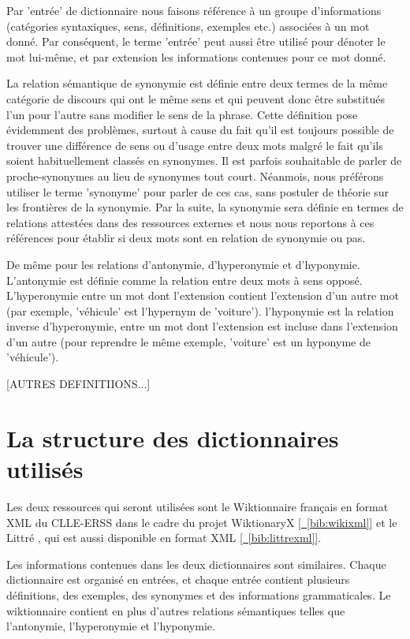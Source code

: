 \documentclass[a4paper, 12pt]{article}
\begin{document}
Par 'entrée' de dictionnaire nous faisons référence à un groupe d'informations (catégories syntaxiques, sens, définitions, exemples etc.) associées à un mot donné. Par conséquent, le terme 'entrée' peut aussi être utilisé pour dénoter le mot lui-même, et par extension les informations contenues pour ce mot donné.

La relation sémantique de synonymie est définie entre deux termes de la même catégorie de discours qui ont le même sens et qui peuvent donc être substitués l'un pour l'autre sans modifier le sens de la phrase. Cette définition pose évidemment des problèmes, surtout à cause du fait qu'il est toujours possible de trouver une différence de sens ou d'usage entre deux mots malgré le fait qu'ils soient habituellement classés en synonymes. Il est parfois souhaitable de parler de proche-synonymes au lieu de synonymes tout court. Néanmois, nous préférons utiliser le terme 'synonyme' pour parler de ces cas, sans postuler de théorie sur les frontières de la synonymie. Par la suite, la synonymie sera définie en termes de relations attestées dans des ressources externes et nous nous reportons à ces références pour établir si deux mots sont en relation de synonymie ou pas.

De même pour les relations d'antonymie, d'hyperonymie et d'hyponymie. L'antonymie est définie comme la relation entre deux mots à sens opposé. L'hyperonymie entre un mot dont l'extension contient l'extension d'un autre mot (par exemple, 'véhicule' est l'hypernym de 'voiture'). l'hyponymie est la relation inverse d'hyperonymie, entre un mot dont l'extension est incluse dans l'extension d'un autre (pour reprendre le même exemple, 'voiture' est un hyponyme de 'véhicule').

[AUTRES DEFINITIIONS...]

\section{La structure des dictionnaires utilisés}

Les deux ressources qui seront utilisées sont le Wiktionnaire français en format XML du CLLE-ERSS dans le cadre du projet WiktionaryX \hyperref[bib:wikixml]{[~\ref*{bib:wikixml}]} et le Littré , qui est aussi disponible en format XML \hyperref[bib:littrexml]{[~\ref*{bib:littrexml}]}.

Les informations contenues dans les deux dictionnaires sont similaires. Chaque dictionnaire est organisé en entrées, et chaque entrée contient plusieurs définitions, des exemples, des synonymes et des informations grammaticales. Le wiktionnaire contient en plus d'autres relations sémantiques telles que l'antonymie, l'hyperonymie et l’hyponymie.
\end{document}
